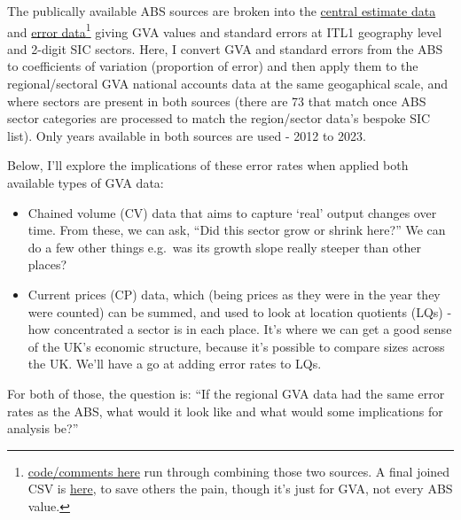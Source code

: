\documentclass[
  letterpaper,
  DIV=11,
  numbers=noendperiod]{scrartcl}
\providecommand{\tightlist}{%
  \setlength{\itemsep}{0pt}\setlength{\parskip}{0pt}}
\begin{document}
The publically available ABS sources are broken into the
\href{https://www.ons.gov.uk/businessindustryandtrade/business/businessservices/datasets/uknonfinancialbusinesseconomyannualbusinesssurveyregionalresultssectionsas}{central
estimate data} and
\href{https://www.ons.gov.uk/businessindustryandtrade/business/businessservices/datasets/uknonfinancialbusinesseconomyannualbusinesssurveyregionalresultsqualitymeasures}{error
data}\footnote{\href{https://github.com/DanOlner/RegionalEconomicTools/blob/gh-pages/bits_of_code/ABS_error_rates.R}{code/comments
  here} run through combining those two sources. A final joined CSV is
  \href{https://github.com/DanOlner/RegionalEconomicTools/blob/gh-pages/data/abs_gva_se_combo.csv}{here},
  to save others the pain, though it's just for GVA, not every ABS
  value.} giving GVA values and standard errors at ITL1 geography level
and 2-digit SIC sectors. Here, I convert GVA and standard errors from
the ABS to coefficients of variation (proportion of error) and then
apply them to the regional/sectoral GVA national accounts data at the
same geogaphical scale, and where sectors are present in both sources
(there are 73 that match once ABS sector categories are processed to
match the region/sector data's bespoke SIC list). Only years available
in both sources are used - 2012 to 2023.

Below, I'll explore the implications of these error rates when applied
both available types of GVA data:

\begin{itemize}
\tightlist
\item
  Chained volume (CV) data that aims to capture `real' output changes
  over time. From these, we can ask, ``Did this sector grow or shrink
  here?'' We can do a few other things e.g.~was its growth slope really
  steeper than other places?
\item
  Current prices (CP) data, which (being prices as they were in the year
  they were counted) can be summed, and used to look at location
  quotients (LQs) - how concentrated a sector is in each place. It's
  where we can get a good sense of the UK's economic structure, because
  it's possible to compare sizes across the UK. We'll have a go at
  adding error rates to LQs.
\end{itemize}

For both of those, the question is: ``If the regional GVA data had the
same error rates as the ABS, what would it look like and what would some
implications for analysis be?''
\end{document}
